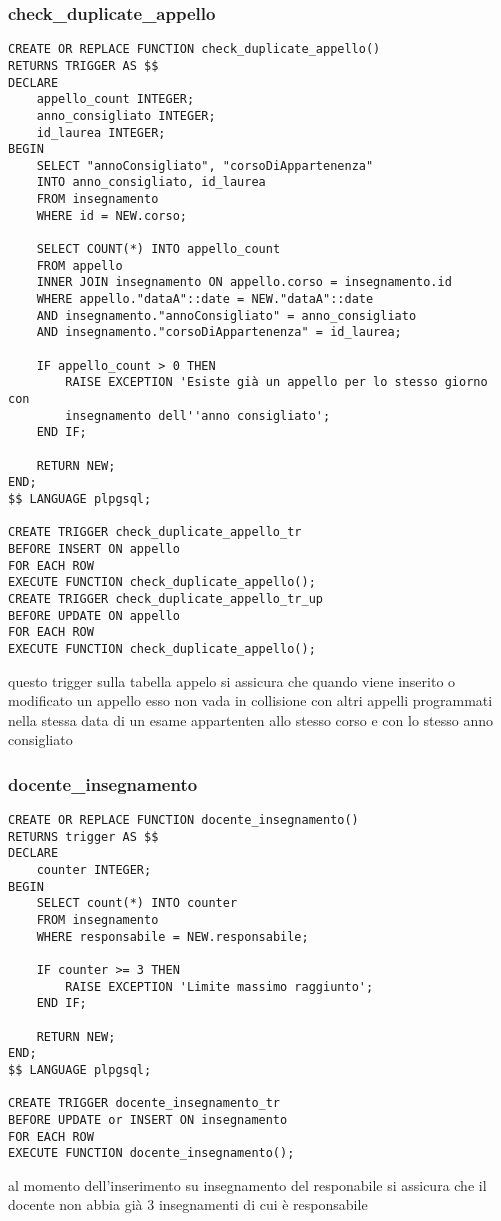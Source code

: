 \subsubsection{check\_duplicate\_appello}\label{checkduplicateappello}
\begin{lstlisting}[style=sqlStyle]
CREATE OR REPLACE FUNCTION check_duplicate_appello()
RETURNS TRIGGER AS $$
DECLARE
    appello_count INTEGER;
    anno_consigliato INTEGER;
    id_laurea INTEGER;
BEGIN
    SELECT "annoConsigliato", "corsoDiAppartenenza"
    INTO anno_consigliato, id_laurea
    FROM insegnamento
    WHERE id = NEW.corso;

    SELECT COUNT(*) INTO appello_count
    FROM appello
    INNER JOIN insegnamento ON appello.corso = insegnamento.id
    WHERE appello."dataA"::date = NEW."dataA"::date
    AND insegnamento."annoConsigliato" = anno_consigliato
    AND insegnamento."corsoDiAppartenenza" = id_laurea;

    IF appello_count > 0 THEN
        RAISE EXCEPTION 'Esiste già un appello per lo stesso giorno con 
        insegnamento dell''anno consigliato';
    END IF;

    RETURN NEW;
END;
$$ LANGUAGE plpgsql;

CREATE TRIGGER check_duplicate_appello_tr
BEFORE INSERT ON appello
FOR EACH ROW
EXECUTE FUNCTION check_duplicate_appello();
CREATE TRIGGER check_duplicate_appello_tr_up
BEFORE UPDATE ON appello
FOR EACH ROW
EXECUTE FUNCTION check_duplicate_appello();
\end{lstlisting}

questo trigger sulla tabella appelo si assicura che quando  viene inserito o modificato un appello esso non vada in collisione con altri appelli programmati nella stessa data di un esame appartenten allo stesso corso e con lo stesso anno consigliato 
\subsubsection{docente\_insegnamento}\label{docenteInsegnamento}
\begin{lstlisting}[style=sqlStyle]
CREATE OR REPLACE FUNCTION docente_insegnamento()
RETURNS trigger AS $$
DECLARE
    counter INTEGER;
BEGIN
    SELECT count(*) INTO counter
    FROM insegnamento
    WHERE responsabile = NEW.responsabile;

    IF counter >= 3 THEN
        RAISE EXCEPTION 'Limite massimo raggiunto';
    END IF;

    RETURN NEW;
END;
$$ LANGUAGE plpgsql;

CREATE TRIGGER docente_insegnamento_tr
BEFORE UPDATE or INSERT ON insegnamento
FOR EACH ROW
EXECUTE FUNCTION docente_insegnamento();
\end{lstlisting}
al momento dell'inserimento su insegnamento del responabile si assicura che il docente non abbia già 3 insegnamenti di cui è responsabile
